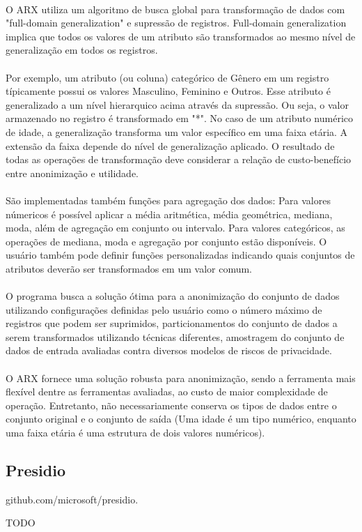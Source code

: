 \paragraph{} O ARX utiliza um algoritmo de busca global para transformação de dados com "full-domain generalization" e supressão de registros. Full-domain generalization implica que todos os  valores de um atributo são transformados ao mesmo nível de generalização em todos os registros.

\paragraph{} Por exemplo, um atributo (ou coluna) categórico de Gênero em um registro típicamente possui os valores Masculino, Feminino e Outros. Esse atributo é generalizado a um nível hierarquico acima através da supressão. Ou seja, o valor armazenado no registro é transformado em "*". No caso de um atributo numérico de idade, a generalização transforma um valor específico em uma faixa etária. A extensão da faixa depende do nível de generalização aplicado. O resultado de todas as operações de transformação deve considerar a relação de custo-benefício entre anonimização e utilidade.

\paragraph{} São implementadas também funções para agregação dos dados: Para valores númericos é possível aplicar a média aritmética, média geométrica, mediana, moda, além de agregação em conjunto ou intervalo. Para valores categóricos, as operações de mediana, moda e agregação por conjunto estão disponíveis. O usuário também pode definir funções personalizadas indicando quais conjuntos de atributos deverão ser transformados em um valor comum.

\paragraph{} O programa busca a solução ótima para a anonimização do conjunto de dados utilizando configurações definidas pelo usuário como o número máximo de registros que podem ser suprimidos, particionamentos do conjunto de dados a serem transformados utilizando técnicas diferentes, amostragem do conjunto de dados de entrada avaliadas contra diversos modelos de riscos de privacidade.

\paragraph{} O ARX fornece uma solução robusta para anonimização, sendo a ferramenta mais flexível dentre as ferramentas avaliadas, ao custo de maior complexidade de operação. Entretanto, não necessariamente conserva os tipos de dados entre o conjunto original e o conjunto de saída (Uma idade é um tipo numérico, enquanto uma faixa etária é uma estrutura de dois valores numéricos).

\subsection{Presidio}

github.com/microsoft/presidio.

TODO